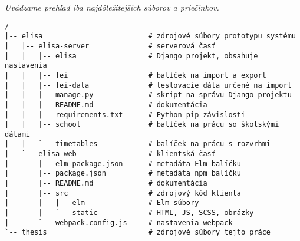 \emph{Uvádzame prehľad iba najdôležitejších súborov a priečinkov.}

\begin{verbatim}
/
|-- elisa                         # zdrojové súbory prototypu systému
|   |-- elisa-server              # serverová časť
|   |   |-- elisa                 # Django projekt, obsahuje nastavenia
|   |   |-- fei                   # balíček na import a export
|   |   |-- fei-data              # testovacie dáta určené na import
|   |   |-- manage.py             # skript na správu Django projektu
|   |   |-- README.md             # dokumentácia
|   |   |-- requirements.txt      # Python pip závislosti
|   |   |-- school                # balíček na prácu so školskými dátami
|   |   `-- timetables            # balíček na prácu s rozvrhmi
|   `-- elisa-web                 # klientská časť
|       |-- elm-package.json      # metadáta Elm balíčku
|       |-- package.json          # metadáta npm balíčku
|       |-- README.md             # dokumentácia
|       |-- src                   # zdrojový kód klienta
|       |   |-- elm               # Elm súbory
|       |   `-- static            # HTML, JS, SCSS, obrázky
|       `-- webpack.config.js     # nastavenia webpack
`-- thesis                        # zdrojové súbory tejto práce

\end{verbatim}
